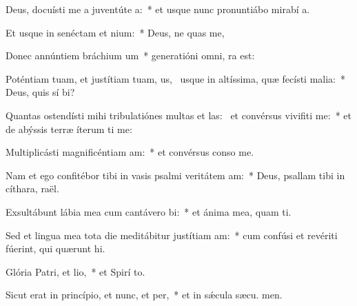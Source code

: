 \item Deus, docuísti me a juventúte a:~* et usque nunc pronuntiábo mirabí a.
\item Et usque in senéctam et nium:~* Deus, ne quas me,
\item Donec annúntiem bráchium um~* generatióni omni,  ra est:
\item Poténtiam tuam, et justítiam tuam, us,~\pscross{} usque in altíssima, quæ fecísti malia:~* Deus, quis sí bi?
\item Quantas ostendísti mihi tribulatiónes multas et las:~\pscross{} et convérsus vivifiti me:~* et de abýssis terræ íterum ti me:
\item Multiplicásti magnificéntiam am:~* et convérsus conso  me.
\item Nam et ego confitébor tibi in vasis psalmi veritátem am:~* Deus, psallam tibi in cíthara,  raël.
\item Exsultábunt lábia mea cum cantávero bi:~* et ánima mea, quam ti.
\item Sed et lingua mea tota die meditábitur justítiam am:~* cum confúsi et revériti fúerint, qui quærunt  hi.
\item Glória Patri, et lio,~* et Spirí to.
\item Sicut erat in princípio, et nunc, et per,~* et in sǽcula sæcu. men.
